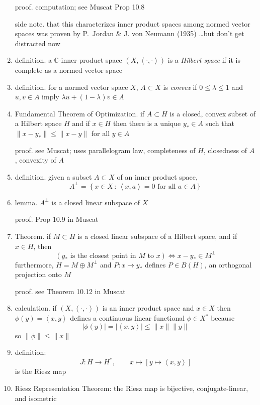 \documentclass[11pt]{article}
\newcommand{\CC}{\mathbb{C}}
\newcommand{\ip}[2]{\ensuremath{\left<#1,#2\right>}}
\begin{document}
\begin{enumerate}
proof. computation; see Muscat Prop 10.8

side note. that this characterizes inner product spaces among normed vector spaces was proven by P.~Jordan \& J. von Neumann (1935) \dots but don't get distracted now

\item definition.  a $\CC$-inner product space $(X,\ip{\cdot}{\cdot})$ is a \emph{Hilbert space} if it is complete as a normed vector space

\item definition. for a normed vector space $X$, $A\subset X$ is \emph{convex} if $0\le \lambda \le 1$ and $u,v\in A$ imply $\lambda u + (1-\lambda) v\in A$

\item Fundamental Theorem of Optimization. if $A \subset H$ is a closed, convex subset of a Hilbert space $H$ and if $x\in H$ then there is a unique $y_* \in A$ such that $\|x-y_*\| \le \|x-y\|$ for all $y\in A$

proof. see Muscat; uses parallelogram law, completeness of $H$, closedness of $A$, convexity of $A$

\item definition.  given a subset $A\subset X$ of an inner product space,
    $$A^\perp = \left\{x\in X \,:\, \ip{x}{a}=0 \text{ for all } a \in A\right\}$$

\item lemma. $A^\perp$ is a closed linear subspace of $X$

proof. Prop 10.9 in Muscat

\item Theorem. if $M\subset H$ is a closed linear subspace of a Hilbert space, and if $x\in H$, then
    $$\left(y_* \text{ is the closest point in $M$ to } x\right) \iff x-y_* \in M^\perp$$
furthermore, $H=M\oplus M^\perp$ and $P:x\mapsto y_*$ defines $P\in B(H)$, an orthogonal projection onto $M$

proof. see Theorem 10.12 in Muscat

\item calculation. if $(X,\ip{\cdot}{\cdot})$ is an inner product space and $x\in X$ then $\phi(y) = \ip{x}{y}$ defines a continuous linear functional $\phi\in X^*$ because
    $$|\phi(y)| = |\ip{x}{y}| \le \|x\|\|y\|$$
so $\|\phi\|\le \|x\|$

\item definition:
    $$J:H \to H^*, \qquad x \mapsto \left[y\mapsto \ip{x}{y}\right]$$
is the Riesz map

\item Riesz Representation Theorem: the Riesz map is bijective, conjugate-linear, and isometric


\end{enumerate}
\end{document}
